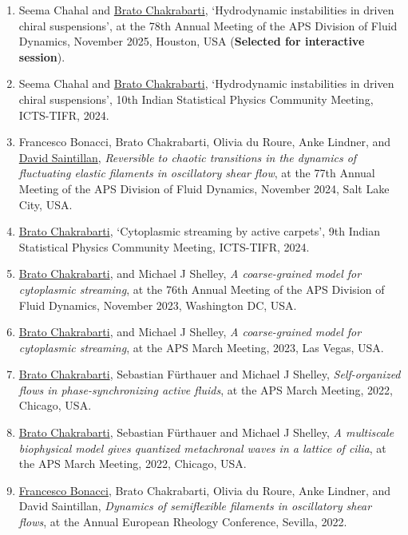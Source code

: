 \documentclass[10pt]{res} %
\begin{document}
\begin{resume}
\begin{enumerate}
\item Seema Chahal and \underline{Brato Chakrabarti}, `Hydrodynamic instabilities in driven chiral suspensions', at the 78th Annual Meeting of the APS Division of Fluid Dynamics, November 2025, Houston, USA (\textbf{Selected for interactive session}).

\item Seema Chahal and \underline{Brato Chakrabarti}, `Hydrodynamic instabilities in driven chiral suspensions', 10th Indian Statistical Physics Community Meeting, ICTS-TIFR, 2024.
	
\item  {Francesco Bonacci}, Brato Chakrabarti, Olivia du Roure, Anke Lindner, and \underline{David Saintillan}, \textit{Reversible to chaotic transitions in the dynamics of fluctuating elastic filaments in oscillatory shear flow}, at the 77th Annual Meeting of the APS Division of Fluid Dynamics, November 2024, Salt Lake City, USA.

\item \underline{Brato Chakrabarti}, `Cytoplasmic streaming by active carpets', 9th Indian Statistical Physics Community Meeting, ICTS-TIFR, 2024.
	
\item  \underline{Brato Chakrabarti}, and Michael J Shelley, \textit{A coarse-grained model for cytoplasmic streaming}, at the 76th Annual Meeting of the APS Division of Fluid Dynamics, November 2023, Washington DC, USA.

\item  \underline{Brato Chakrabarti}, and Michael J Shelley, \textit{A coarse-grained model for cytoplasmic streaming}, at the APS March Meeting, 2023, Las Vegas, USA.

\item  \underline{Brato Chakrabarti}, Sebastian F\"{u}rthauer and Michael J Shelley, \textit{Self-organized flows in phase-synchronizing active fluids}, at the APS March Meeting, 2022, Chicago, USA.
	
\item  \underline{Brato Chakrabarti}, Sebastian F\"{u}rthauer and Michael J Shelley, \textit{A multiscale biophysical model gives quantized metachronal waves in a lattice of cilia}, at the APS March Meeting, 2022, Chicago, USA.
	
\item \underline{Francesco Bonacci}, Brato Chakrabarti, Olivia du Roure, Anke Lindner, and David Saintillan, \textit{Dynamics of semiflexible filaments in oscillatory shear flows}, at the Annual European Rheology Conference, Sevilla, 2022.


\end{enumerate}
\end{resume}
\end{document}
